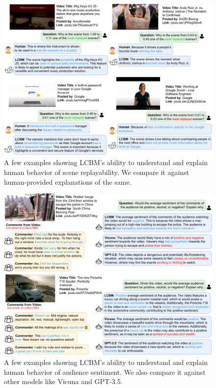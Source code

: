 \begin{figure}[!htbp]
    \centering
    \includegraphics[width=\textwidth]{images/replay-explains.jpeg}
    \caption{A few examples showing LCBM's ability to understand and explain human behavior of scene replayability. We compare it against human-provided explanations of the same.    \label{fig:replay-explains}}
\end{figure}



\begin{figure}[!htbp]
    \centering
    \includegraphics[width=\textwidth]{images/comment-explains-compressed.pdf}
    \caption{A few examples showing LCBM's ability to understand and explain human behavior of audience sentiment. We also compare it against other models like Vicuna and GPT-3.5. \label{fig:comment-explains}}
\end{figure}




